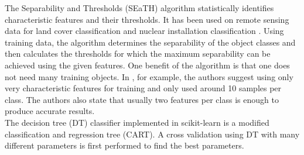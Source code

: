 \documentclass[authoryear, review,12pt,number]{elsarticle}
\begin{document}
The Separability and Thresholds (SEaTH) algorithm \citep{Nussbaum2006}
statistically identifies characteristic features and their thresholds. It has
been used on remote sensing data for land cover classification \citep{Gao2011}
and nuclear installation classification \citep{Nussbaum2006}. Using training
data, the algorithm determines the separability of the object classes and then
calculates the thresholds for which the maximum separability can be achieved
using the given features. One benefit of the algorithm is that one does not
need many training objects.  In  \cite{Nussbaum2006}, for example, the authors
suggest using only very characteristic features for training and only used
around 10 samples per class. The authors also state that usually two features
per class is enough to produce accurate results.\\

The decision tree (DT) classifier implemented in scikit-learn is a modified
classification and regression tree (CART)\citep{scikit-learn}. A cross
validation using DT with many different parameters is first performed to find
the best parameters. 

\end{document}
